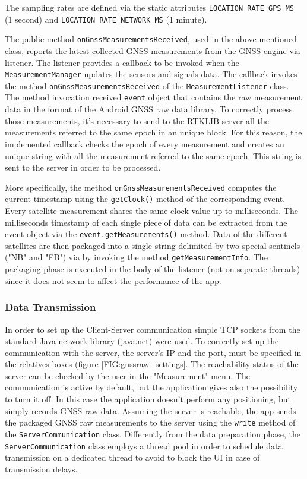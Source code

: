 The sampling rates are defined via the static attributes \verb+LOCATION_RATE_GPS_MS+ (1 second) 
and \verb+LOCATION_RATE_NETWORK_MS+ (1 minute).

The public method \verb+onGnssMeasurementsReceived+, used in the above mentioned class, reports the latest collected  GNSS measurements from the GNSS engine via  listener.
The listener provides a callback to be invoked when the \verb+MeasurementManager+ updates the sensors and signals data. 
The callback invokes the  method \verb+onGnssMeasurementsReceived+ of the \verb+MeasurementListener+ class. The method invocation received  \verb+event+ object that contains the raw measurement data in the format of the Android GNSS raw data library.
To correctly process those measurements, it's necessary to send to the RTKLIB server all the measurements referred to the same epoch in an unique block. For this reason, the implemented callback checks the epoch of every measurement and creates an unique string with all the measurement referred to the same epoch. This string is sent to the server in order to be processed.

More specifically, the method \verb+onGnssMeasurementsReceived+ computes the current timestamp using the \verb+getClock()+ method of the corresponding event. Every satellite measurement shares the same clock value up to milliseconds. The milliseconds timestamp of each single piece of data can be extracted from the event object via the \verb+event.getMeasurements()+ method. 
Data of the different satellites are then packaged into a single string delimited by two special sentinels ("NB" and "FB") via 
by invoking  the method \verb+getMeasurementInfo+.
The packaging phase is executed in the body of the listener 
(not on separate threads) since it does not seem to affect the performance of the app.   
%
\subsubsection*{Data Transmission}
%
In order to set up the Client-Server communication simple TCP sockets from the standard Java network library (java.net) were used.
To correctly set up the communication with the server, the server's IP and the port, must be specified in the relatives boxes (figure \ref{FIG:gnssraw_settings}. The reachability status of the server can be checked by the user in the "Measurement" menu.
The communication is active by default, but the application gives also the possibility to turn it off. In this case the application doesn't perform any positioning, but simply records GNSS raw data. 
Assuming the server is reachable, the app sends the packaged GNSS raw measurements to the server using the \verb+write+ method of the  \verb+ServerCommunication+ class.
Differently from the data preparation phase, 
the \verb+ServerCommunication+ class employs a thread pool in order to schedule data transmission on a dedicated thread to avoid to block the UI in case of transmission delays.
%
